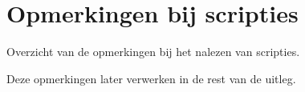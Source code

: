\chapter{Opmerkingen bij scripties}
\label{chap_app1}
Overzicht van de opmerkingen bij het nalezen van scripties.

Deze opmerkingen later verwerken in de rest van de uitleg.











